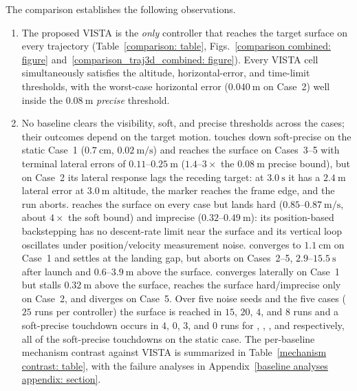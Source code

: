 \documentclass{IEEEtaes}
\theoremstyle{definition}
\theoremstyle{remark}
\begin{document}
The comparison establishes the following observations.
\begin{enumerate}
    \item The proposed VISTA is the \emph{only} controller that reaches the target surface on every trajectory (Table~\ref{comparison: table}, Figs.~\ref{comparison combined: figure} and~\ref{comparison_traj3d_combined: figure}). Every VISTA cell simultaneously satisfies the altitude, horizontal-error, and time-limit thresholds, with the worst-case horizontal error ($0.040~\text{m}$ on Case~2) well inside the $0.08~\text{m}$ \emph{precise} threshold.
    \item No baseline clears the visibility, soft, and precise thresholds across the cases; their outcomes depend on the target motion. \cite{lin2022} touches down soft-precise on the static Case~1 ($0.7~\text{cm}$, $0.02~\text{m/s}$) and reaches the surface on Cases~3--5 with terminal lateral errors of $0.11$--$0.25~\text{m}$ ($1.4$--$3\times$ the $0.08~\text{m}$ precise bound), but on Case~2 its lateral response lags the receding target: at $3.0~\text{s}$ it has a $2.4~\text{m}$ lateral error at $3.0~\text{m}$ altitude, the marker reaches the frame edge, and the run aborts. \cite{zhang2026} reaches the surface on every case but lands hard ($0.85$--$0.87~\text{m/s}$, about $4\times$ the soft bound) and imprecise ($0.32$--$0.49~\text{m}$): its position-based backstepping has no descent-rate limit near the surface and its vertical loop oscillates under position/velocity measurement noise. \cite{lin2023} converges to $1.1~\text{cm}$ on Case~1 and settles at the landing gap, but aborts on Cases~2--5, $2.9$--$15.5~\text{s}$ after launch and $0.6$--$3.9~\text{m}$ above the surface. \cite{cho2022} converges laterally on Case~1 but stalls $0.32~\text{m}$ above the surface, reaches the surface hard/imprecise only on Case~2, and diverges on Case~5. Over five noise seeds and the five cases ($25$ runs per controller) the surface is reached in $15$, $20$, $4$, and $8$ runs and a soft-precise touchdown occurs in $4$, $0$, $3$, and $0$ runs for \cite{lin2022}, \cite{zhang2026}, \cite{lin2023}, and \cite{cho2022} respectively, all of the soft-precise touchdowns on the static case. The per-baseline mechanism contrast against VISTA is summarized in Table~\ref{mechanism contrast: table}, with the failure analyses in Appendix~\ref{baseline analyses appendix: section}.


\end{enumerate}
\end{document}
